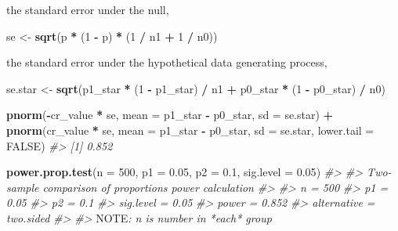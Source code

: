 \documentclass[]{book}
\newenvironment{Shaded}{\begin{snugshade}}{\end{snugshade}}
\newcommand{\KeywordTok}[1]{\textcolor[rgb]{0.13,0.29,0.53}{\textbf{#1}}}
\newcommand{\DataTypeTok}[1]{\textcolor[rgb]{0.13,0.29,0.53}{#1}}
\newcommand{\DecValTok}[1]{\textcolor[rgb]{0.00,0.00,0.81}{#1}}
\newcommand{\FloatTok}[1]{\textcolor[rgb]{0.00,0.00,0.81}{#1}}
\newcommand{\StringTok}[1]{\textcolor[rgb]{0.31,0.60,0.02}{#1}}
\newcommand{\CommentTok}[1]{\textcolor[rgb]{0.56,0.35,0.01}{\textit{#1}}}
\newcommand{\OtherTok}[1]{\textcolor[rgb]{0.56,0.35,0.01}{#1}}
\newcommand{\OperatorTok}[1]{\textcolor[rgb]{0.81,0.36,0.00}{\textbf{#1}}}
\newcommand{\AlertTok}[1]{\textcolor[rgb]{0.94,0.16,0.16}{#1}}
\newcommand{\NormalTok}[1]{#1}
\theoremstyle{definition}
\theoremstyle{definition}
\theoremstyle{definition}
\theoremstyle{remark}
\begin{document}
the standard error under the null,

\begin{Shaded}
\begin{Highlighting}[]
\NormalTok{se <-}\StringTok{ }\KeywordTok{sqrt}\NormalTok{(p }\OperatorTok{*}\StringTok{ }\NormalTok{(}\DecValTok{1} \OperatorTok{-}\StringTok{ }\NormalTok{p) }\OperatorTok{*}\StringTok{ }\NormalTok{(}\DecValTok{1} \OperatorTok{/}\StringTok{ }\NormalTok{n1 }\OperatorTok{+}\StringTok{ }\DecValTok{1} \OperatorTok{/}\StringTok{ }\NormalTok{n0))}
\end{Highlighting}
\end{Shaded}

the standard error under the hypothetical data generating process,

\begin{Shaded}
\begin{Highlighting}[]
\NormalTok{se.star <-}\StringTok{ }\KeywordTok{sqrt}\NormalTok{(p1_star }\OperatorTok{*}\StringTok{ }\NormalTok{(}\DecValTok{1} \OperatorTok{-}\StringTok{ }\NormalTok{p1_star) }\OperatorTok{/}\StringTok{ }\NormalTok{n1 }\OperatorTok{+}\StringTok{ }\NormalTok{p0_star }\OperatorTok{*}\StringTok{ }\NormalTok{(}\DecValTok{1} \OperatorTok{-}\StringTok{ }\NormalTok{p0_star) }\OperatorTok{/}\StringTok{ }\NormalTok{n0)}
\end{Highlighting}
\end{Shaded}

\begin{Shaded}
\begin{Highlighting}[]
\KeywordTok{pnorm}\NormalTok{(}\OperatorTok{-}\NormalTok{cr_value }\OperatorTok{*}\StringTok{ }\NormalTok{se, }\DataTypeTok{mean =}\NormalTok{ p1_star }\OperatorTok{-}\StringTok{ }\NormalTok{p0_star, }\DataTypeTok{sd =}\NormalTok{ se.star) }\OperatorTok{+}
\StringTok{    }\KeywordTok{pnorm}\NormalTok{(cr_value }\OperatorTok{*}\StringTok{ }\NormalTok{se, }\DataTypeTok{mean =}\NormalTok{ p1_star }\OperatorTok{-}\StringTok{ }\NormalTok{p0_star, }\DataTypeTok{sd =}\NormalTok{ se.star,}
          \DataTypeTok{lower.tail =} \OtherTok{FALSE}\NormalTok{)}
\CommentTok{#> [1] 0.852}
\end{Highlighting}
\end{Shaded}

\begin{Shaded}
\begin{Highlighting}[]
\KeywordTok{power.prop.test}\NormalTok{(}\DataTypeTok{n =} \DecValTok{500}\NormalTok{, }\DataTypeTok{p1 =} \FloatTok{0.05}\NormalTok{, }\DataTypeTok{p2 =} \FloatTok{0.1}\NormalTok{, }\DataTypeTok{sig.level =} \FloatTok{0.05}\NormalTok{)}
\CommentTok{#> }
\CommentTok{#>      Two-sample comparison of proportions power calculation }
\CommentTok{#> }
\CommentTok{#>               n = 500}
\CommentTok{#>              p1 = 0.05}
\CommentTok{#>              p2 = 0.1}
\CommentTok{#>       sig.level = 0.05}
\CommentTok{#>           power = 0.852}
\CommentTok{#>     alternative = two.sided}
\CommentTok{#> }
\CommentTok{#> }\AlertTok{NOTE}\CommentTok{: n is number in *each* group}
\end{Highlighting}
\end{Shaded}
\end{document}
